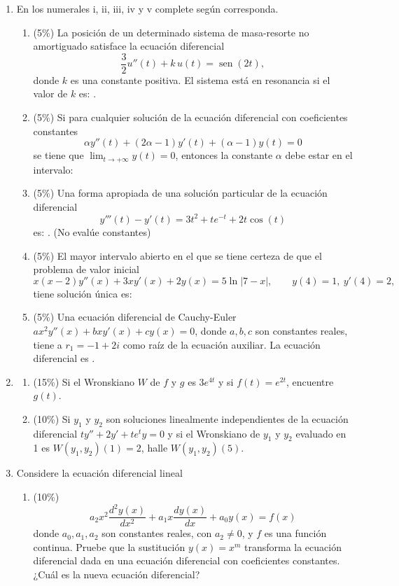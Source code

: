 \documentclass[11pt]{article}
\begin{document}
\vspace{10pt}
\begin{enumerate}
\item{} En los numerales i, ii, iii, iv y v complete según corresponda.
\begin{enumerate}
\item{} (5\%) La posición de un determinado sistema de masa-resorte no amortiguado satisface la ecuación diferencial
\[
\frac{3}{2}u''(t)+k\,u(t) = \operatorname{sen}(2t),
\]
\noindent donde $k$ es una constante positiva. El sistema está en resonancia si el valor de $k$ es: \dotfill.

\item{} (5\%) Si para cualquier solución de la ecuación diferencial con coeficientes constantes
\[
\alpha y''(t)+(2\alpha-1)y'(t)+(\alpha-1)y(t)=0
\]
\noindent se tiene que $\displaystyle\lim_{t\to+\infty}y(t)=0$, entonces la constante $\alpha$ debe estar en el intervalo: \dotfill

\item{} (5\%) Una forma apropiada de una solución particular de la ecuación diferencial
\[
y'''(t)-y'(t) = 3t^2+te^{-t}+2t\cos(t)
\]
\noindent es: \dotfill. (No evalúe constantes)

\item{} (5\%) El mayor intervalo abierto en el que se tiene certeza de que el problema de valor inicial
\[
x(x-2)y''(x)+3xy'(x)+2y(x)=5\ln|7-x|, \qquad y(4)=1,\ y'(4)=2,
\]
\noindent tiene solución única es: \dotfill

\item{} (5\%) Una ecuación diferencial de Cauchy-Euler $ax^2y''(x)+bxy'(x)+cy(x)=0$, donde $a,b,c$ son constantes reales, tiene a $r_1=-1+2i$ como raíz de la ecuación auxiliar. La ecuación diferencial es \dotfill.
\end{enumerate}

\item{}
\begin{enumerate}
\item{} (15\%) Si el Wronskiano $W$ de $f$ y $g$ es $3e^{4t}$ y si $f(t)=e^{2t}$, encuentre $g(t)$.

\item{} (10\%) Si $y_1$ y $y_2$ son soluciones linealmente independientes de la ecuación diferencial $ty''+2y'+te^ty=0$ y si el Wronskiano de $y_1$ y $y_2$ evaluado en 1 es $W(y_1,y_2)(1)=2$, halle $W(y_1,y_2)(5)$.
\end{enumerate}

\item{} Considere la ecuación diferencial lineal
\begin{enumerate}
\item{} (10\%)
\[
a_2x^2\frac{d^2y(x)}{dx^2}+a_1x\frac{dy(x)}{dx}+a_0y(x) = f(x)
\]
\noindent donde $a_0,a_1,a_2$ son constantes reales, con $a_2\neq 0$, y $f$ es una función continua. Pruebe que la sustitución $y(x)=x^m$ transforma la ecuación diferencial dada en una ecuación diferencial con coeficientes constantes. ¿Cuál es la nueva ecuación diferencial?


\end{enumerate}
\end{enumerate}
\end{document}
